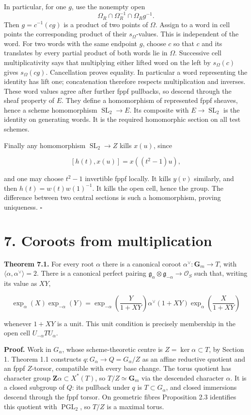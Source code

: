 \documentclass[11pt,a4paper,openany]{report}
\newcounter{none}
\begin{document}
In particular, for one \(g\), use the nonempty open \[
\Omega_R\cap\Omega_R^{-1}\cap\Omega_Rg^{-1}.
\] Then \(g=c^{-1}(cg)\) is a product of two points of \(\Omega\). Assign to a word in cell points the corresponding product of their \(s_\Omega\)-values. This is independent of the word. For two words with the same endpoint \(g\), choose \(c\) so that \(c\) and its translates by every partial product of both words lie in \(\Omega\). Successive cell multiplicativity says that multiplying either lifted word on the left by \(s_\Omega(c)\) gives \(s_\Omega(cg)\). Cancellation proves equality. In particular a word representing the identity has lift one; concatenation therefore respects multiplication and inverses. These word values agree after further fppf pullbacks, so descend through the sheaf property of \(E\). They define a homomorphism of represented fppf sheaves, hence a scheme homomorphism \(\operatorname{SL}_2\to E\). Its composite with \(E\to\operatorname{SL}_2\) is the identity on generating words. It is the required homomorphic section on all test schemes.

Finally any homomorphism \(\operatorname{SL}_2\to Z\) kills \(x(u)\), since

\[
[h(t),x(u)]=x((t^2-1)u),
\]

and one may choose \(t^2-1\) invertible fppf locally. It kills \(y(v)\) similarly, and then \(h(t)=w(t)w(1)^{-1}\). It kills the open cell, hence the group. The difference between two central sections is such a homomorphism, proving uniqueness. \(\square\)

\section{7. Coroots from multiplication}\label{AG-RG-03-coroots-from-multiplication}

\textbf{Theorem 7.1.} For every root \(\alpha\) there is a canonical coroot \(\alpha^\vee:\mathbf G_m\to T\), with \(\langle\alpha,\alpha^\vee\rangle=2\). There is a canonical perfect pairing \(\mathfrak g_\alpha\otimes\mathfrak g_{-\alpha}\to\mathcal O_S\) such that, writing its value as \(XY\),

\[
\exp_\alpha(X)\exp_{-\alpha}(Y)
=\exp_{-\alpha}\left(\frac{Y}{1+XY}\right)
\alpha^\vee(1+XY)
\exp_\alpha\left(\frac{X}{1+XY}\right)
\tag{2}
\]

whenever \(1+XY\) is a unit. This unit condition is precisely membership in the open cell \(U_{-\alpha}TU_\alpha\).

\textbf{Proof.} Work in \(G_\alpha\), whose scheme-theoretic centre is \(Z=\ker\alpha\subset T\), by Section 1. Theorem 1.1 constructs \(q:G_\alpha\to Q=G_\alpha/Z\) as an affine reductive quotient and an fppf \(Z\)-torsor, compatible with every base change. The torus quotient has character group \(\mathbf Z\alpha\subset X^*(T)\), so \(T/Z\simeq\mathbf G_m\) via the descended character \(\alpha\). It is a closed subgroup of \(Q\): its pullback under \(q\) is \(T\subset G_\alpha\), and closed immersions descend through the fppf torsor. On geometric fibres Proposition 2.3 identifies this quotient with \(\operatorname{PGL}_2\), so \(T/Z\) is a maximal torus.
\end{document}
